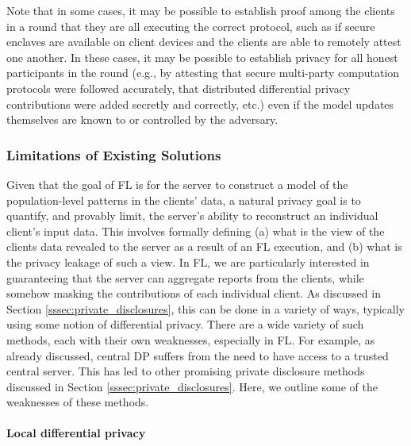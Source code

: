 Note that in some cases, it may be possible to establish proof among the clients in a round that they are all executing the correct protocol, such as if secure enclaves are available on client devices and the clients are able to remotely attest one another.  In these cases, it may be possible to establish privacy for all honest participants in the round (e.g., by attesting that secure multi-party computation protocols were followed accurately, that distributed differential privacy contributions were added secretly and correctly, etc.) even if the model updates themselves are known to or controlled by the adversary.

\subsubsection{Limitations of Existing Solutions}
\label{sssec:limitations}
Given that the goal of FL is for the server to construct a model of the population-level patterns in the clients' data, a natural privacy goal is to quantify, and provably limit, the server's ability to reconstruct an individual client's input data. This involves formally defining (a) what is the view of the clients data revealed to the server as a result of an FL execution, and (b) what is the privacy leakage of such a view. In FL, we are particularly interested in guaranteeing that the server can aggregate reports from the clients, while somehow masking the contributions of each individual client. As discussed in Section \ref{sssec:private_disclosures}, this can be done in a variety of ways, typically using some notion of differential privacy. There are a wide variety of such methods, each with their own weaknesses, especially in FL. For example, as already discussed, central DP suffers from the need to have access to a trusted central server. This has led to other promising private disclosure methods discussed in Section \ref{sssec:private_disclosures}. Here, we outline some of the weaknesses of these methods.

\paragraph{Local differential privacy} 

